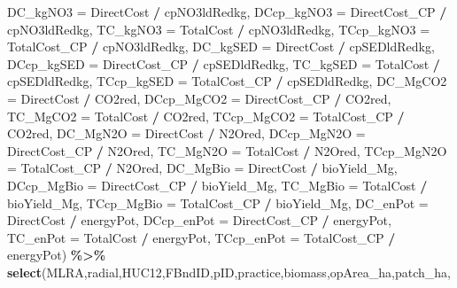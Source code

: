 \documentclass[
]{article}
\newenvironment{Shaded}{\begin{snugshade}}{\end{snugshade}}
\newcommand{\AttributeTok}[1]{\textcolor[rgb]{0.13,0.29,0.53}{#1}}
\newcommand{\FunctionTok}[1]{\textcolor[rgb]{0.13,0.29,0.53}{\textbf{#1}}}
\newcommand{\NormalTok}[1]{#1}
\newcommand{\SpecialCharTok}[1]{\textcolor[rgb]{0.81,0.36,0.00}{\textbf{#1}}}
\begin{document}
\begin{Shaded}
\begin{Highlighting}[]
         \AttributeTok{DC\_kgNO3 =}\NormalTok{ DirectCost }\SpecialCharTok{/}\NormalTok{ cpNO3ldRedkg,}
         \AttributeTok{DCcp\_kgNO3 =}\NormalTok{ DirectCost\_CP }\SpecialCharTok{/}\NormalTok{ cpNO3ldRedkg,}
         \AttributeTok{TC\_kgNO3 =}\NormalTok{ TotalCost }\SpecialCharTok{/}\NormalTok{ cpNO3ldRedkg,}
         \AttributeTok{TCcp\_kgNO3 =}\NormalTok{ TotalCost\_CP }\SpecialCharTok{/}\NormalTok{ cpNO3ldRedkg,}
         \AttributeTok{DC\_kgSED =}\NormalTok{ DirectCost }\SpecialCharTok{/}\NormalTok{ cpSEDldRedkg,}
         \AttributeTok{DCcp\_kgSED =}\NormalTok{ DirectCost\_CP }\SpecialCharTok{/}\NormalTok{ cpSEDldRedkg,}
         \AttributeTok{TC\_kgSED =}\NormalTok{ TotalCost }\SpecialCharTok{/}\NormalTok{ cpSEDldRedkg,}
         \AttributeTok{TCcp\_kgSED =}\NormalTok{ TotalCost\_CP }\SpecialCharTok{/}\NormalTok{ cpSEDldRedkg,}
         \AttributeTok{DC\_MgCO2 =}\NormalTok{ DirectCost }\SpecialCharTok{/}\NormalTok{ CO2red,}
         \AttributeTok{DCcp\_MgCO2 =}\NormalTok{ DirectCost\_CP }\SpecialCharTok{/}\NormalTok{ CO2red,}
         \AttributeTok{TC\_MgCO2 =}\NormalTok{ TotalCost }\SpecialCharTok{/}\NormalTok{ CO2red,}
         \AttributeTok{TCcp\_MgCO2 =}\NormalTok{ TotalCost\_CP }\SpecialCharTok{/}\NormalTok{ CO2red,}
         \AttributeTok{DC\_MgN2O =}\NormalTok{ DirectCost }\SpecialCharTok{/}\NormalTok{ N2Ored,}
         \AttributeTok{DCcp\_MgN2O =}\NormalTok{ DirectCost\_CP }\SpecialCharTok{/}\NormalTok{ N2Ored,}
         \AttributeTok{TC\_MgN2O =}\NormalTok{ TotalCost }\SpecialCharTok{/}\NormalTok{ N2Ored,}
         \AttributeTok{TCcp\_MgN2O =}\NormalTok{ TotalCost\_CP }\SpecialCharTok{/}\NormalTok{ N2Ored,}
         \AttributeTok{DC\_MgBio =}\NormalTok{ DirectCost }\SpecialCharTok{/}\NormalTok{ bioYield\_Mg,}
         \AttributeTok{DCcp\_MgBio =}\NormalTok{ DirectCost\_CP }\SpecialCharTok{/}\NormalTok{ bioYield\_Mg,}
         \AttributeTok{TC\_MgBio =}\NormalTok{ TotalCost }\SpecialCharTok{/}\NormalTok{ bioYield\_Mg,}
         \AttributeTok{TCcp\_MgBio =}\NormalTok{ TotalCost\_CP }\SpecialCharTok{/}\NormalTok{ bioYield\_Mg,}
         \AttributeTok{DC\_enPot =}\NormalTok{ DirectCost }\SpecialCharTok{/}\NormalTok{ energyPot,}
         \AttributeTok{DCcp\_enPot =}\NormalTok{ DirectCost\_CP }\SpecialCharTok{/}\NormalTok{ energyPot,}
         \AttributeTok{TC\_enPot =}\NormalTok{ TotalCost }\SpecialCharTok{/}\NormalTok{ energyPot,}
         \AttributeTok{TCcp\_enPot =}\NormalTok{ TotalCost\_CP }\SpecialCharTok{/}\NormalTok{ energyPot) }\SpecialCharTok{\%\textgreater{}\%}
  \FunctionTok{select}\NormalTok{(MLRA,radial,HUC12,FBndID,pID,practice,biomass,opArea\_ha,patch\_ha,}

\end{Highlighting}
\end{Shaded}
\end{document}
